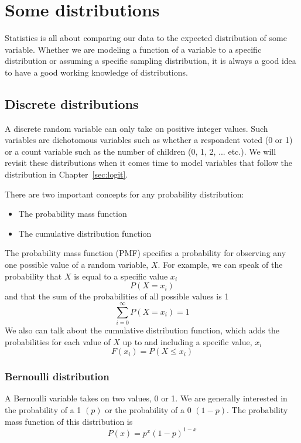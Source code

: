
\chapter{Some distributions}

Statistics is all about comparing our data to the expected distribution of some variable. Whether we are modeling a function of a variable to a specific distribution or assuming a specific sampling distribution, it is always a good idea to have a good working knowledge of distributions.

\section{Discrete distributions}
\label{sec:disdist}

A discrete random variable can only take on positive integer values. Such variables are dichotomous variables such as whether a respondent voted (0 or 1) or a count variable such as the number of children (0, 1, 2, ... etc.). We will revisit these distributions when it comes time to model variables that follow the distribution in Chapter~\ref{sec:logit}.

There are two important concepts for any probability distribution:
\begin{itemize}
\item{The probability mass function}
\item{The cumulative distribution function}
\end{itemize}

The probability mass function (PMF) specifies a probability for observing any one possible value of a random variable, $X$. For example, we can speak of the probability that $X$ is equal to a specific value $x_i$
\begin{equation}
P\left(X=x_i\right)
\end{equation}
and that the sum of the probabilities of all possible values is 1
\begin{equation}
\sum_{i=0}^{\infty} P\left(X=x_i\right) = 1
\end{equation}
We also can talk about the cumulative distribution function, which adds the probabilities for each value of $X$ up to and including a specific value, $x_i$
\begin{equation}
F(x_i)=P\left(X\le x_i\right)
\end{equation}
\subsection{Bernoulli distribution}
\label{sec:bernoilli}
A Bernoulli variable takes on two values, 0 or 1. We are generally interested in the probability of a 1 $(p)$ or the probability of a 0 $(1-p)$. The probability mass function of this distribution is
\begin{equation}
P(x) = p^x\left(1-p\right)^{1-x}
\end{equation}
